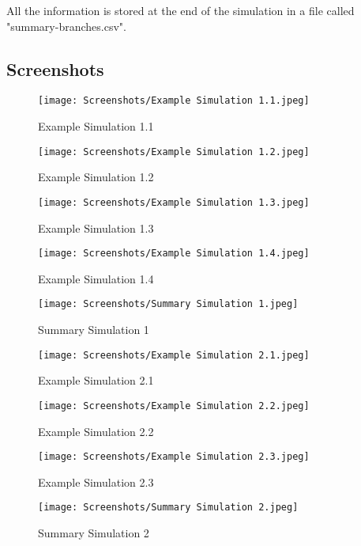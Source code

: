 \documentclass[titlepage, 12pt]{article}
\begin{document}
All the information is stored at the end of the simulation in a file called "summary-branches.csv".

\newpage

\subsection{Screenshots}

\begin{figure} [h]
    \centering
    \texttt{[image: Screenshots/Example Simulation 1.1.jpeg]}
    \caption{Example Simulation 1.1}
    \label{fig:Example Simulation 1.1}
\end{figure}

\begin{figure} [h]
    \centering
    \texttt{[image: Screenshots/Example Simulation 1.2.jpeg]}
    \caption{Example Simulation 1.2}
    \label{fig:Example Simulation 1.2}
\end{figure}

\begin{figure} [h]
    \centering
    \texttt{[image: Screenshots/Example Simulation 1.3.jpeg]}
    \caption{Example Simulation 1.3}
    \label{fig:Example Simulation 1.3}
\end{figure}

\begin{figure} [h]
    \centering
    \texttt{[image: Screenshots/Example Simulation 1.4.jpeg]}
    \caption{Example Simulation 1.4}
    \label{fig:Example Simulation 1.4}
\end{figure}

\begin{figure} [h]
    \centering
    \texttt{[image: Screenshots/Summary Simulation 1.jpeg]}
    \caption{Summary Simulation 1}
    \label{fig:Summary Simulation 1}
\end{figure}

\begin{figure} [h]
    \centering
    \texttt{[image: Screenshots/Example Simulation 2.1.jpeg]}
    \caption{Example Simulation 2.1}
    \label{fig:Example Simulation 2.1}
\end{figure}

\begin{figure} [h]
    \centering
    \texttt{[image: Screenshots/Example Simulation 2.2.jpeg]}
    \caption{Example Simulation 2.2}
    \label{fig:Example Simulation 2.2}
\end{figure}

\begin{figure} [h]
    \centering
    \texttt{[image: Screenshots/Example Simulation 2.3.jpeg]}
    \caption{Example Simulation 2.3}
    \label{fig:Example Simulation 2.3}
\end{figure}

\begin{figure} [h]
    \centering
    \texttt{[image: Screenshots/Summary Simulation 2.jpeg]}
    \caption{Summary Simulation 2}
    \label{fig:Summary Simulation 2}
\end{figure}
\end{document}
